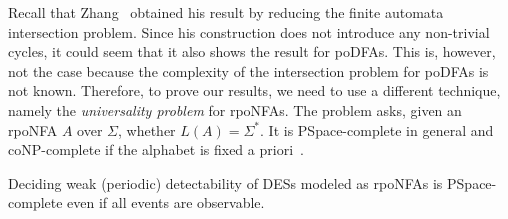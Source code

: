 \documentclass[twocolumn,amsthm]{autartx}
\begin{document}
  Recall that Zhang~\cite{Zhang17} obtained his result by reducing the finite automata intersection problem. Since his construction does not introduce any non-trivial cycles, it could seem that it also shows the result for poDFAs. This is, however, not the case because the complexity of the intersection problem for poDFAs is not known. Therefore, to prove our results, we need to use a different technique, namely the {\em universality problem\/} for rpoNFAs. The problem asks, given an rpoNFA $A$ over $\Sigma$, whether $L(A)=\Sigma^*$. It is PSpace-complete in general and coNP-complete if the alphabet is fixed a priori~\cite{mfcs16:mktmmt_full}.
    

  \begin{thm}\label{thm5}
    Deciding weak (periodic) detectability of DESs modeled as rpoNFAs is PSpace-complete even if all events are observable.
  \end{thm}
\end{document}
